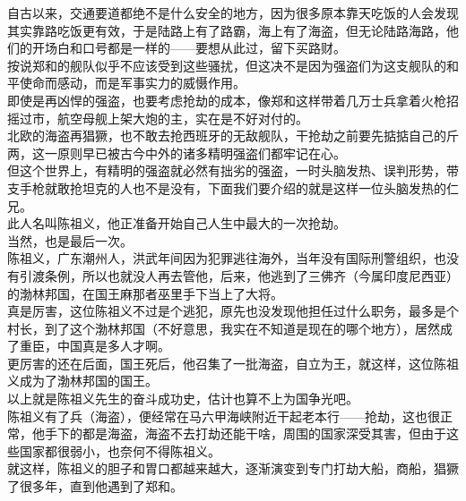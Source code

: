 \begin{multicols}{\theparacolNo}
自古以来，交通要道都绝不是什么安全的地方，因为很多原本靠天吃饭的人会发现其实靠路吃饭更有效，于是陆路上有了路霸，海上有了海盗，但无论陆路海路，他们的开场白和口号都是一样的——要想从此过，留下买路财。\\

按说郑和的舰队似乎不应该受到这些骚扰，但这决不是因为强盗们为这支舰队的和平使命而感动，而是军事实力的威慑作用。\\

即使是再凶悍的强盗，也要考虑抢劫的成本，像郑和这样带着几万士兵拿着火枪招摇过市，航空母舰上架大炮的主，实在是不好对付的。\\

北欧的海盗再猖獗，也不敢去抢西班牙的无敌舰队，干抢劫之前要先掂掂自己的斤两，这一原则早已被古今中外的诸多精明强盗们都牢记在心。\\

但这个世界上，有精明的强盗就必然有拙劣的强盗，一时头脑发热、误判形势，带支手枪就敢抢坦克的人也不是没有，下面我们要介绍的就是这样一位头脑发热的仁兄。\\

此人名叫陈祖义，他正准备开始自己人生中最大的一次抢劫。\\

当然，也是最后一次。\\

陈祖义，广东潮州人，洪武年间因为犯罪逃往海外，当年没有国际刑警组织，也没有引渡条例，所以也就没人再去管他，后来，他逃到了三佛齐（今属印度尼西亚）的渤林邦国，在国王麻那者巫里手下当上了大将。\\

真是厉害，这位陈祖义不过是个逃犯，原先也没发现他担任过什么职务，最多是个村长，到了这个渤林邦国（不好意思，我实在不知道是现在的哪个地方），居然成了重臣，中国真是多人才啊。\\

更厉害的还在后面，国王死后，他召集了一批海盗，自立为王，就这样，这位陈祖义成为了渤林邦国的国王。\\

以上就是陈祖义先生的奋斗成功史，估计也算不上为国争光吧。\\

陈祖义有了兵（海盗），便经常在马六甲海峡附近干起老本行——抢劫，这也很正常，他手下的都是海盗，海盗不去打劫还能干啥，周围的国家深受其害，但由于这些国家都很弱小，也奈何不得陈祖义。\\

就这样，陈祖义的胆子和胃口都越来越大，逐渐演变到专门打劫大船，商船，猖獗了很多年，直到他遇到了郑和。\\


\end{multicols}
